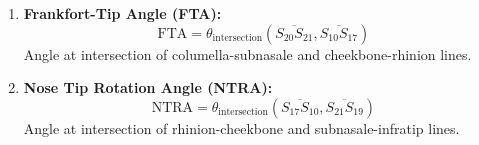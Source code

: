 \begin{enumerate}
    \item \textbf{Frankfort-Tip Angle (FTA):}
    \begin{equation}
    \text{FTA} = \theta_{\text{intersection}}(\overline{S_{20}S_{21}}, \overline{S_{10}S_{17}})
    \end{equation}
    Angle at intersection of columella-subnasale and cheekbone-rhinion lines.
    
    \item \textbf{Nose Tip Rotation Angle (NTRA):}
    \begin{equation}
    \text{NTRA} = \theta_{\text{intersection}}(\overline{S_{17}S_{10}}, \overline{S_{21}S_{19}})
    \end{equation}
    Angle at intersection of rhinion-cheekbone and subnasale-infratip lines.
\end{enumerate}

